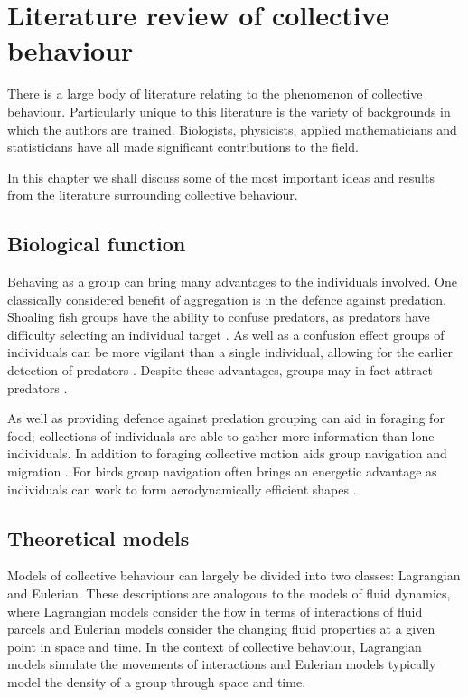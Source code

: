 \chapter{Literature review of collective behaviour}
\label{cha:lit_review}

There is a large body of literature relating to the phenomenon of collective behaviour. Particularly unique to this literature is the variety of backgrounds in which the authors are trained. Biologists, physicists, applied mathematicians and statisticians have all made significant contributions to the field.

In this chapter we shall discuss some of the most important ideas and results from the literature surrounding collective behaviour.

\section{Biological function}
\label{sec:biological_function}

Behaving as a group can bring many advantages to the individuals involved. One classically considered  benefit of aggregation is in the defence against predation. Shoaling fish groups have the ability to confuse predators, as predators have difficulty selecting an individual target \citep{landeau86}. As well as a confusion effect groups of individuals can be more vigilant than a single individual, allowing for the earlier detection of predators \citep{pitcher93}. Despite these advantages, groups may in fact attract predators \citep{wittenberger85}.

As well as providing defence against predation grouping can aid in foraging for food; collections of individuals are able to gather more information than lone individuals. In addition to foraging collective motion aids group navigation and migration \citep{simmons04}. For birds group navigation often brings an energetic advantage as individuals can work to form aerodynamically efficient shapes \citep{weimerskirch01}.

\section{Theoretical models}
\label{sec:models}

Models of collective behaviour can largely be divided into two classes: Lagrangian and Eulerian. These descriptions are analogous to the models of fluid dynamics, where Lagrangian models consider the flow in terms of interactions of fluid parcels and Eulerian models consider the changing fluid properties at a given point in space and time. In the context of collective behaviour, Lagrangian models simulate the movements of interactions and Eulerian models typically model the density of a group through space and time.

